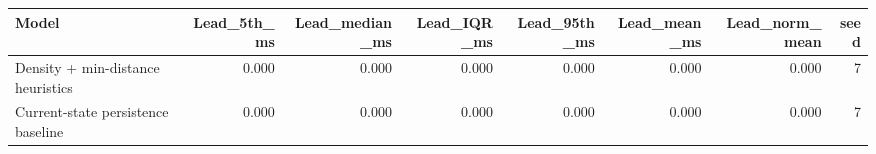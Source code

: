 \begin{tabular}{lrrrrrrr}
\toprule
Model & Lead\_5th\_ms & Lead\_median\_ms & Lead\_IQR\_ms & Lead\_95th\_ms & Lead\_mean\_ms & Lead\_norm\_mean & seed \\
\midrule
Density + min-distance heuristics & 0.000 & 0.000 & 0.000 & 0.000 & 0.000 & 0.000 & 7 \\
Current-state persistence baseline & 0.000 & 0.000 & 0.000 & 0.000 & 0.000 & 0.000 & 7 \\
\bottomrule
\end{tabular}